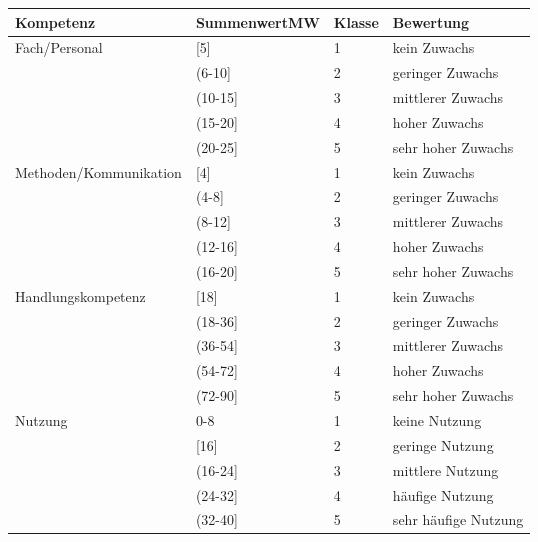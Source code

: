 \begin{table}[H]
\centering
\begin{tabular}{@{}llll@{}}
\toprule
Kompetenz              & SummenwertMW & Klasse & Bewertung          \\ \midrule
Fach/Personal          & [5]        & 1      & kein Zuwachs       \\
                       & (6-10]       & 2      & geringer Zuwachs   \\
                       & (10-15]      & 3      & mittlerer Zuwachs  \\
                       & (15-20]      & 4      & hoher Zuwachs      \\
                       & (20-25]      & 5      & sehr hoher Zuwachs \\ \cmidrule(r){1-4}
Methoden/Kommunikation & [4]        & 1      & kein Zuwachs       \\
                       & (4-8]        & 2      & geringer Zuwachs   \\
                       & (8-12]       & 3      & mittlerer Zuwachs  \\
                       & (12-16]      & 4      & hoher Zuwachs      \\
                       & (16-20]      & 5      & sehr hoher Zuwachs \\ 
                       \cmidrule(r){1-4}
Handlungskompetenz 	& [18]       & 1      & kein Zuwachs       \\
                       & (18-36]        & 2      & geringer Zuwachs   \\
                       & (36-54]       & 3      & mittlerer Zuwachs  \\
                       & (54-72]      & 4      & hoher Zuwachs      \\
                       & (72-90]      & 5      & sehr hoher Zuwachs \\ 
                       \cmidrule(r){1-4}
Nutzung	& 0-8       & 1      & keine Nutzung       \\
                       & [16]        & 2      & geringe Nutzung   \\
                       & (16-24]       & 3      & mittlere Nutzung  \\
                       & (24-32]     & 4      & häufige Nutzung      \\
                       & (32-40]      & 5      & sehr häufige Nutzung \\ 
                       \bottomrule
\end{tabular}
\end{table}

